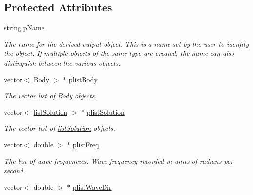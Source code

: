 \subsection*{Protected Attributes}
\begin{DoxyCompactItemize}
\item 
\hypertarget{class_output_derived_a54e3e1356bd379db875c0ce8ee223ef6}{string \hyperlink{class_output_derived_a54e3e1356bd379db875c0ce8ee223ef6}{p\-Name}}\label{class_output_derived_a54e3e1356bd379db875c0ce8ee223ef6}

\begin{DoxyCompactList}\small\item\em The name for the derived output object. This is a name set by the user to idenfity the object. If multiple objects of the same type are created, the name can also distinguish between the various objects. \end{DoxyCompactList}\item 
\hypertarget{class_output_derived_a584a7b228dfc4ea3830631763e0a36fa}{vector$<$ \hyperlink{class_body}{Body} $>$ $\ast$ \hyperlink{class_output_derived_a584a7b228dfc4ea3830631763e0a36fa}{plist\-Body}}\label{class_output_derived_a584a7b228dfc4ea3830631763e0a36fa}

\begin{DoxyCompactList}\small\item\em The vector list of \hyperlink{class_body}{Body} objects. \end{DoxyCompactList}\item 
\hypertarget{class_output_derived_a3d5228713e1711a3ab57fe3bd0887c6e}{vector$<$ \hyperlink{classlist_solution}{list\-Solution} $>$ $\ast$ \hyperlink{class_output_derived_a3d5228713e1711a3ab57fe3bd0887c6e}{plist\-Solution}}\label{class_output_derived_a3d5228713e1711a3ab57fe3bd0887c6e}

\begin{DoxyCompactList}\small\item\em The vector list of \hyperlink{classlist_solution}{list\-Solution} objects. \end{DoxyCompactList}\item 
\hypertarget{class_output_derived_a2c367aa51c34c8eb43dc226be92c3d07}{vector$<$ double $>$ $\ast$ \hyperlink{class_output_derived_a2c367aa51c34c8eb43dc226be92c3d07}{plist\-Freq}}\label{class_output_derived_a2c367aa51c34c8eb43dc226be92c3d07}

\begin{DoxyCompactList}\small\item\em The list of wave frequencies. Wave frequency recorded in units of radians per second. \end{DoxyCompactList}\item 
\hypertarget{class_output_derived_a10727e0eabf2b6f22940cb2c9f510772}{vector$<$ double $>$ $\ast$ \hyperlink{class_output_derived_a10727e0eabf2b6f22940cb2c9f510772}{plist\-Wave\-Dir}}\label{class_output_derived_a10727e0eabf2b6f22940cb2c9f510772}


\end{DoxyCompactItemize}
